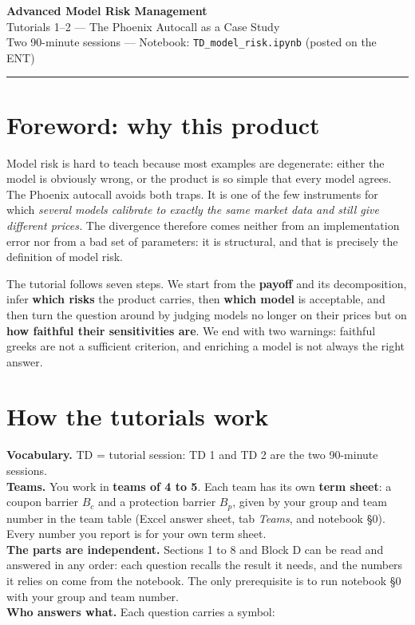 \documentclass[11pt,a4paper]{article}
\begin{document}
\begin{center}
  {\LARGE\bfseries Advanced Model Risk Management}\\[0.4em]
  {\large Tutorials 1--2 --- The Phoenix Autocall as a Case Study}\\[2.5em]
  Two 90-minute sessions --- Notebook: \texttt{TD\_model\_risk.ipynb} (posted on the ENT)\\[0.6em]
  \rule{0.7\textwidth}{0.4pt}
\end{center}

\section*{Foreword: why this product}

Model risk is hard to teach because most examples are degenerate: either the model is obviously
wrong, or the product is so simple that every model agrees. The Phoenix autocall avoids both traps.
It is one of the few instruments for which \emph{several models calibrate to exactly the same market data and
still give different prices.} The divergence therefore comes neither from an implementation error nor
from a bad set of parameters: it is structural, and that is precisely the definition of model risk.

The tutorial follows seven steps. We start from the \textbf{payoff} and its decomposition, infer \textbf{which
risks} the product carries, then \textbf{which model} is acceptable, and then turn the question around by
judging models no longer on their prices but on \textbf{how faithful their sensitivities are}. We end with
two warnings: faithful greeks are not a sufficient criterion, and enriching a model is not always the
right answer.

\section*{How the tutorials work}

\noindent\textbf{Vocabulary.} TD = tutorial session: TD 1 and TD 2 are the two 90-minute sessions.\\
\textbf{Teams.} You work in \textbf{teams of 4 to 5}. Each team has its own \textbf{term sheet}: a coupon barrier $B_c$
and a protection barrier $B_p$, given by your group and team number in the team table (Excel answer
sheet, tab \emph{Teams}, and notebook \S0). Every number you report is for your own term sheet.\\
\textbf{The parts are independent.} Sections 1 to 8 and Block D can be read and answered in any order:
each question recalls the result it needs, and the numbers it relies on come from the notebook. The
only prerequisite is to run notebook \S0 with your group and team number.\\
\textbf{Who answers what.} Each question carries a symbol:
\end{document}
